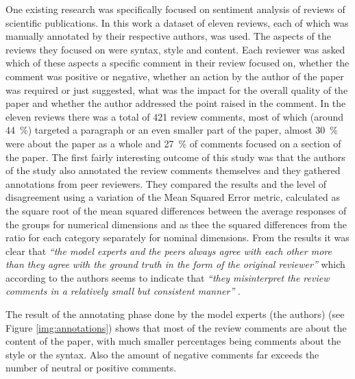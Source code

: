 One existing research was specifically focused on sentiment analysis of reviews of scientific publications. In this work a dataset of eleven reviews, each of which was manually annotated by their respective authors, was used. The aspects of the reviews they focused on were syntax, style and content. Each reviewer was asked which of these aspects a specific comment in their review focused on, whether the comment was positive or negative, whether an action by the author of the paper was required or just suggested, what was the impact for the overall quality of the paper and whether the author addressed the point raised in the comment. \cite{nano_peer} In the eleven reviews there was a total of 421 review comments, most of which (around 44~\%) targeted a paragraph or an even smaller part of the paper, almost 30~\% were about the paper as a whole and 27~\% of comments focused on a section of the paper. 
The first fairly interesting outcome of this study was that the authors of the study also annotated the review comments themselves and they gathered annotations from peer reviewers. They compared the results and the level of disagreement using a variation of the Mean Squared Error metric, calculated as the square root of the mean squared differences between the average responses of the groups for numerical dimensions and as thee the squared
differences from the ratio for each category separately for nominal dimensions. From the results it was clear that \textit{``the model experts and the
peers always agree with each other more than they agree with the
ground truth in the form of the original reviewer''} \cite[p. 6]{nano_peer} which according to the authors seems to indicate that \textit{``they misinterpret the review comments in a relatively
small but consistent manner''} \cite[p. 6]{nano_peer}.

The result of the annotating phase done by the model experts (the authors) (see Figure \ref{img:annotations}) shows that most of the review comments are about the content of the paper, with much smaller percentages being comments about the style or the syntax. Also the amount of negative comments far exceeds the number of neutral or positive comments. 


